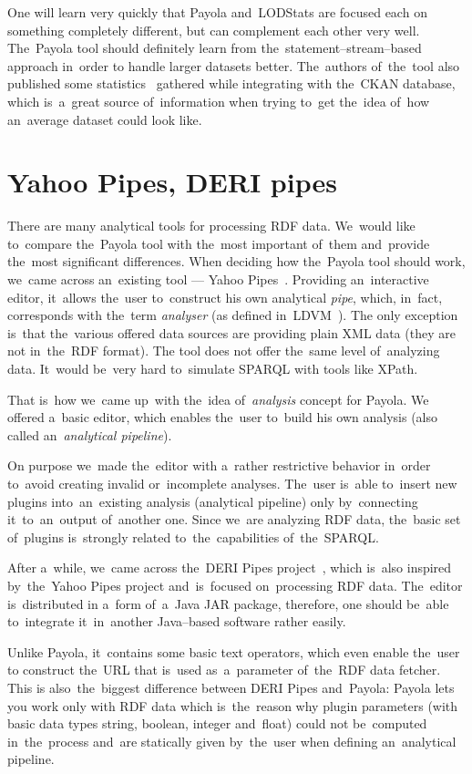 One will learn very quickly that Payola and~LODStats are focused each 
on something completely different, but can complement each other very well. The~Payola 
tool should definitely learn from the~statement--stream--based approach in~order 
to handle larger datasets better. The~authors of~the~tool also published
some statistics~\cite{lodstats} gathered while integrating with the~CKAN database, which is~a~great source of~information when trying to~get the~idea of~how an~average dataset 
could look like. 

\section{Yahoo Pipes, DERI pipes}
There are many analytical tools for processing RDF data. We~would like to~compare the~Payola tool with the~most important of~them and~provide the~most significant 
differences. When deciding how the~Payola tool should work, we~came 
across an~existing tool --- Yahoo 
Pipes~\cite{yahoo-pipes}. Providing an~interactive 
editor, it~allows the~user to~construct his own analytical \emph{pipe}, 
which, in~fact, corresponds with the~term \emph{analyser} (as defined in~LDVM~\cite{ldvm}).
The only exception is~that the~various offered data sources are
providing plain XML data (they are not in~the~RDF format).
The tool does not offer the~same level of~analyzing data.
It~would be~very hard to~simulate SPARQL with tools like XPath.

That is~how we~came up~with the~idea of~\emph{analysis} concept for Payola. 
We offered a~basic editor, which enables the~user to~build his own analysis
(also called an~\emph{analytical pipeline}).
 
On purpose we~made the~editor with a~rather restrictive behavior in~order to~avoid creating invalid or~incomplete analyses. The~user is~able to~insert new 
plugins into~an~existing analysis (analytical pipeline) only by~connecting it~to~an~output of~another 
one. Since we~are analyzing RDF data, the~basic set of~plugins is~strongly 
related to~the~capabilities of~the~SPARQL.

After a~while, we~came across the~DERI Pipes 
project~\cite{deri-pipes}, which is~also inspired by~the~Yahoo 
Pipes project and~is~focused on~processing RDF data. The~editor is~distributed 
in a~form of~a~Java JAR package, therefore, one should be~able to~integrate it~in~another
Java--based software rather easily.

Unlike Payola, it~contains some basic text operators, which even enable the~user  
to construct the~URL that is~used as~a~parameter of~the~RDF data fetcher. This 
is also~the~biggest difference between DERI Pipes and~Payola: Payola lets 
you work only with RDF data which is~the~reason why plugin parameters (with basic data types string,
boolean, integer and~float) could not be~computed in~the~process and~are 
statically given by~the~user when defining an~analytical pipeline.

